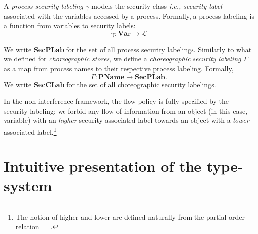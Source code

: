 \documentclass[12pt,a4paper,twoside]{book}
\begin{document}
A \textit{process security labeling} $\gamma$ models the security class \textit{i.e., security label} associated with the variables accessed by a process. Formally, a process labeling is a function from variables to security labels:
\[
	\gamma : \textbf{Var} \longrightarrow \mathscr{L}
\]

We write \textbf{SecPLab} for the set of all process security labelings.
Similarly to what we defined for \textit{choreographic stores}, we define a \textit{choreographic security labeling} $\Gamma$ as a map from process names to their respective process labeling. Formally,
\[
\Gamma : \textbf{PName} \longrightarrow \textbf{SecPLab}.
\]
We write \textbf{SecCLab} for the set of all choreographic security labelings.

In the non-interference framework, the flow-policy is fully specified by the security labeling: we forbid any flow of information from an object (in this case, variable) with an \textit{higher} security associated label towards an object with a \textit{lower} associated label.\footnote{The notion of higher and lower are defined naturally from the partial order relation $\sqsubseteq$.}

\section{Intuitive presentation of the type-system}
\label{type:intuitive}
\end{document}
